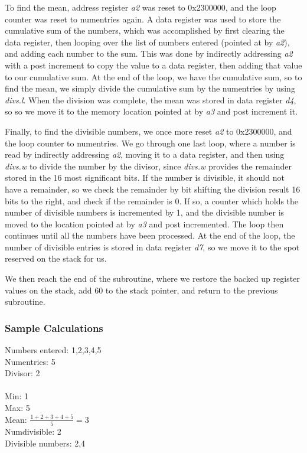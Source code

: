 \documentclass[letterpaper]{article}
\begin{document}
    To find the mean, address register \textit{a2} was reset to 0x2300000,
    and the loop counter was reset to numentries again. A data register was used
    to store the cumulative sum of the numbers, which was accomplished by
    first clearing the data register, then looping over the list of
    numbers entered (pointed at by \textit{a2}), and adding each number
    to the sum. This was done by indirectly addressing \textit{a2} with
    a post increment to copy the value to a data register, then adding
    that value to our cumulative sum. At the end of the loop, we have the
    cumulative sum, so to
    find the mean, we simply divide the cumulative sum by the numentries
    by using \textit{divs.l}. When the division was complete, the
    mean was stored in data register \textit{d4}, so so we move it to
    the memory location pointed at by \textit{a3} and post increment it.

    Finally, to find the divisible numbers, we once more reset \textit{a2}
    to 0x2300000, and the loop counter to numentries. We go through one last loop,
    where a number is read by indirectly addressing \textit{a2}, moving it to
    a data register, and then using \textit{divs.w} to divide the number by the
    divisor, since \textit{divs.w} provides the remainder stored in the
    16 most significant bits. If the number is divisible, it
    should not have a remainder, so we check the remainder by
    bit shifting the division result 16 bits to the right, and check if
    the remainder is 0. If so, a counter which holds the number of
    divisible numbers is incremented by 1, and the divisible number
    is moved to the location pointed at by \textit{a3} and post incremented.
    The loop then continues until all the numbers have been processed. At the
    end of the loop, the number of divisible entries is stored in data register \textit{d7},
    so we move it to the spot reserved on the stack for us.

    We then reach the end of the subroutine, where we restore the backed up register values
    on the stack, add 60 to the stack pointer, and return to the previous subroutine.


    \subsubsection{Sample Calculations}
    Numbers entered: 1,2,3,4,5\\
    Numentries: 5\\
    Divisor: 2\\ \\
    Min: 1\\
    Max: 5\\
    Mean: $\frac{1+2+3+4+5}{5}=3$\\
    Numdivisible: 2\\
    Divisible numbers: 2,4
\end{document}
